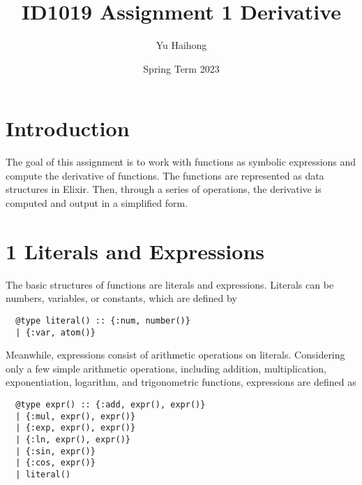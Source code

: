 \documentclass[a4paper,11pt]{article}
\begin{document}
\title{
    \textbf{ID1019 Assignment 1 Derivative}
}
\author{Yu Haihong}
\date{Spring Term 2023}

\maketitle

\section*{Introduction}

The goal of this assignment is to work with functions as symbolic expressions and compute the derivative of functions. 
The functions are represented as data structures in Elixir. Then, through a series of operations, the derivative is computed and output in a simplified form.

\section*{1 Literals and Expressions}

The basic structures of functions are literals and expressions. Literals can be numbers, variables, or constants, which are defined by 
\begin{verbatim}
  @type literal() :: {:num, number()}
  | {:var, atom()}
\end{verbatim}

Meanwhile, expressions consist of arithmetic operations on literals. Considering only a few simple arithmetic operations, including addition, multiplication, exponentiation, logarithm, and trigonometric functions, expressions are defined as
\begin{verbatim}
  @type expr() :: {:add, expr(), expr()}
  | {:mul, expr(), expr()}
  | {:exp, expr(), expr()}
  | {:ln, expr(), expr()}
  | {:sin, expr()}
  | {:cos, expr()}
  | literal()
\end{verbatim}
\end{document}
